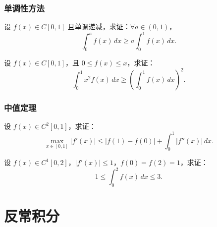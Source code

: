 \documentclass[lang=cn,10pt,thmcnt=section]{elegantbook}
\begin{document}
\subsection{单调性方法}
\begin{example}
	设 \( f(x) \in C[0,1] \) 且单调递减，求证：\(\forall a \in (0,1)\)，
\[
\int_0^a f(x) \, dx \geq a \int_0^1 f(x) \, dx.
\]
\end{example}
\begin{example}
	设 \( f(x) \in C[0,1] \)，且 \( 0 \leq f(x) \leq x \)，求证：
\[
\int_0^1 x^2 f(x) \, dx \geq \left( \int_0^1 f(x) \, dx \right)^2.
\]
\end{example}
\subsection{中值定理}
\begin{example}
	设 \( f(x) \in C^2[0,1] \)，求证：
\[
\max_{x \in [0,1]} |f'(x)| \leq |f(1) - f(0)| + \int_0^1 |f''(x)| \, dx.
\]
\end{example}
\begin{example}
	设 \( f(x) \in C^1[0,2] \)，\(|f'(x)| \leq 1\)，\( f(0) = f(2) = 1 \)，求证：
\[
1 \leq \int_0^2 f(x) \, dx \leq 3.
\]
\end{example}
\chapter{反常积分}
\end{document}
